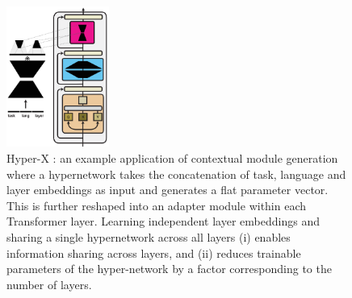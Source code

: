 

\begin{figure}
  \begin{center}
    \includegraphics[width=0.3\textwidth]{img/hyperx.pdf}
  \end{center}
  \caption{Hyper-X \citep{Ustun:2022hyperx}: an example application of contextual module generation where a hypernetwork takes the concatenation of task, language and layer embeddings as input and generates a flat parameter vector. This is further reshaped into an adapter module within each Transformer layer. Learning independent layer embeddings and sharing a single hypernetwork across all layers \citep{Ansell2021MADG} (i) enables information sharing across layers, and (ii) reduces trainable parameters of the hyper-network by a factor corresponding to the number of layers.}
  \label{fig:app_hyperx}
\end{figure}

